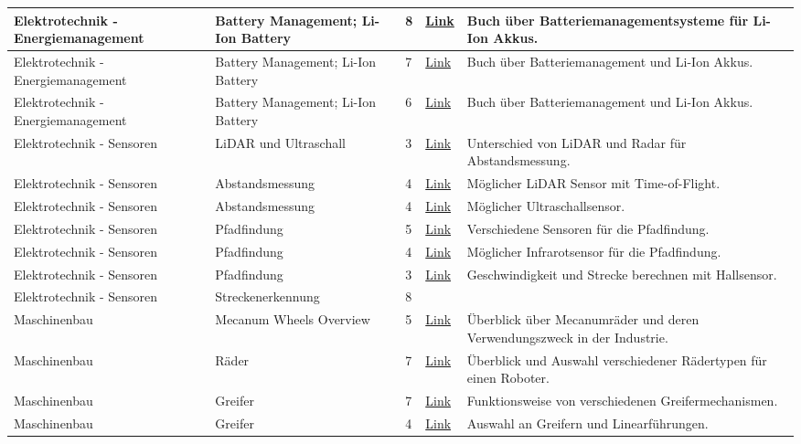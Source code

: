 \documentclass[../main.tex]{subfiles}
\begin{document}
\begin{longtable}{@{} L{2.5cm} L{2.9cm} C{1cm} L{1.2cm} L{6cm} @{}}
Elektrotechnik - Energiemanagement & Battery Management; Li-Ion Battery & 8 & \href{https://learning.oreilly.com/library/view/battery-management-system/9781119154006/}{Link} & Buch über Batteriemanagementsysteme für Li-Ion Akkus. \\
\hline
Elektrotechnik - Energiemanagement & Battery Management; Li-Ion Battery & 7 & \href{https://app.knovel.com/kn/resources/kpSALIBM02/toc}{Link} & Buch über Batteriemanagement und Li-Ion Akkus. \\
\hline
Elektrotechnik - Energiemanagement & Battery Management; Li-Ion Battery & 6 & \href{https://app.knovel.com/kn/resources/kpBMSLLIB4/toc}{Link} & Buch über Batteriemanagement und Li-Ion Akkus. \\
\hline
Elektrotechnik - Sensoren & LiDAR und Ultraschall & 3 & \href{https://www.carwow.de/automagazin/auto-lexikon/auto-technologie/lidar-sensor-auto}{Link} & Unterschied von LiDAR und Radar für Abstandsmessung. \\
\hline
Elektrotechnik - Sensoren & Abstandsmessung & 4 & \href{https://ch.farnell.com/dfrobot/sen0259/laser-entfernungssensor-lidar/dp/3769959?cfm=true}{Link} & Möglicher LiDAR Sensor mit Time-of-Flight. \\
\hline
Elektrotechnik - Sensoren & Abstandsmessung & 4 & \href{https://www.az-delivery.de/products/3er-set-hc-sr04-ultraschallmodule}{Link} & Möglicher Ultraschallsensor. \\
\hline
Elektrotechnik - Sensoren & Pfadfindung & 5 & \href{https://intorobotics.com/types-of-sensors-for-target-detection-and-tracking/}{Link} & Verschiedene Sensoren für die Pfadfindung. \\
\hline
Elektrotechnik - Sensoren & Pfadfindung & 4 & \href{https://www.az-delivery.de/products/linienfolger-modul-mit-tcrt5000-und-analog-ausgang}{Link} & Möglicher Infrarotsensor für die Pfadfindung. \\
\hline
Elektrotechnik - Sensoren & Pfadfindung & 3 & \href{https://kiranjoy.blog/2018/08/19/calculate-speed-using-hall-effect-sensor/}{Link} & Geschwindigkeit und Strecke berechnen mit Hallsensor. \\
\hline
Elektrotechnik - Sensoren & Streckenerkennung & 8 & & \\
\hline
Maschinenbau & Mecanum Wheels Overview & 5 & \href{https://intapi.sciendo.com/pdf/10.2478/kbo-2022-0086}{Link} & Überblick über Mecanumräder und deren Verwendungszweck in der Industrie. \\
\hline
Maschinenbau & Räder & 7 & \href{https://www.quasi.ai/choosing-the-right-robotic-wheels-for-your-amr/}{Link} & Überblick und Auswahl verschiedener Rädertypen für einen Roboter. \\
\hline
Maschinenbau & Greifer & 7 & \href{https://qviro.com/blog/introduction-grippers/}{Link} & Funktionsweise von verschiedenen Greifermechanismen. \\
\hline
Maschinenbau & Greifer & 4 & \href{https://www.freise-automation.de/produkte/greifer-handhabungstechnik/}{Link} & Auswahl an Greifern und Linearführungen. \\


\end{longtable}
\end{document}
